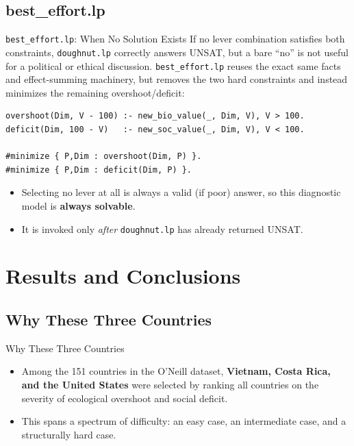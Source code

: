 \documentclass[11pt,aspectratio=169]{beamer}
\begin{document}
\subsection{best\_effort.lp}
\begin{frame}[fragile]{\texttt{best\_effort.lp}: When No Solution Exists}
  If no lever combination satisfies both constraints, \texttt{doughnut.lp} correctly answers UNSAT, but a bare ``no'' is not useful for a political or ethical discussion. \texttt{best\_effort.lp} reuses the exact same facts and effect-summing machinery, but \alert{removes} the two hard constraints and instead minimizes the remaining overshoot/deficit:
\begin{lstlisting}
overshoot(Dim, V - 100) :- new_bio_value(_, Dim, V), V > 100.
deficit(Dim, 100 - V)   :- new_soc_value(_, Dim, V), V < 100.

#minimize { P,Dim : overshoot(Dim, P) }.
#minimize { P,Dim : deficit(Dim, P) }.
\end{lstlisting}
  \begin{itemize}
    \item Selecting no lever at all is always a valid (if poor) answer, so this diagnostic model is \textbf{always solvable}.
    \item It is invoked only \emph{after} \texttt{doughnut.lp} has already returned UNSAT.
  \end{itemize}
\end{frame}

\section[Results]{Results and Conclusions}

\subsection{Why These Three Countries}
\begin{frame}{Why These Three Countries}
  \begin{itemize}
    \item Among the 151 countries in the O'Neill dataset, \textbf{Vietnam, Costa Rica, and the United States} were selected by ranking all countries on the severity of ecological overshoot and social deficit.
    \item This spans a \alert{spectrum of difficulty}: an easy case, an intermediate case, and a structurally hard case.
  \end{itemize}
\end{frame}
\end{document}
